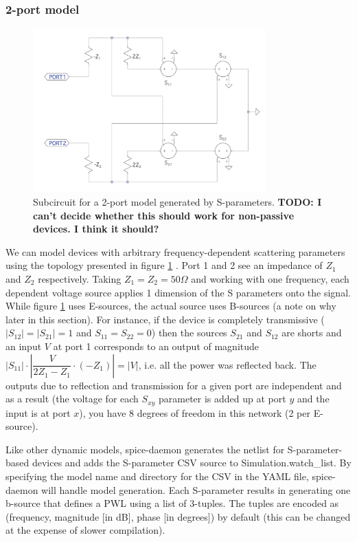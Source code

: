 \documentclass[]{article}
\newcommand{\cf}[1]{\textsf{#1}}
\begin{document}
\subsubsection{2-port model}

\begin{figure}
    \centering
    \includegraphics[width=0.8\textwidth]{figs/2port.png}
    \caption{Subcircuit for a 2-port model generated by S-parameters. \textbf{TODO: I can't decide whether this should work for non-passive devices. I think it should?}}
    \label{fig:2port}
\end{figure}

We can model devices with arbitrary frequency-dependent scattering parameters 
using the topology presented in figure \ref{fig:2port} \cite{microsim}. Port 1 and 2 see
an impedance of $Z_1$ and $Z_2$ respectively. Taking $Z_1=Z_2=50\Omega$ and
working with one frequency, each dependent voltage source applies 1 dimension
of the S parameters onto the signal. While figure \ref{fig:2port} uses E-sources,
the actual source uses B-sources (a note on why later in this section).
For instance, if the device is completely
transmissive ($|S_{12}|=|S_{21}|=1$ and $S_{11}=S_{22}=0$) then the sources $S_{21}$
and $S_{12}$ are shorts and an input $V$ at port 1 corresponds to an output of 
magnitude $|S_{11}|\cdot \left|\dfrac{V}{2Z_1-Z_1}\cdot (-Z_1)\right|=|V|$, i.e.
all the power was reflected back. The outputs due to reflection and transmission 
for a given port are independent and as a result (the voltage for each $S_{xy}$ parameter is
added up at port $y$ and the input is at port $x$), you have 8 degrees of freedom in this
network (2 per E-source).

Like other dynamic models, spice-daemon generates the netlist for S-parameter-based
devices and adds the S-parameter CSV source to \cf{Simulation.watch\_list}. By specifying
the model name and directory for the CSV in the YAML file, spice-daemon will handle model 
generation. Each S-parameter results in generating one b-source that defines a PWL using
a list of 3-tuples. The tuples are encoded as \cf{(frequency, magnitude [in dB], 
phase [in degrees])} by default (this 
can be changed at the expense of slower compilation).
\end{document}
